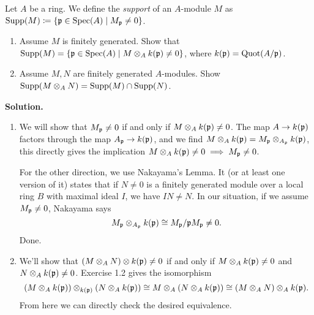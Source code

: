 \documentclass[a4paper,11pt]{article}
\begin{document}
Let $A$ be a ring. We define the \textit{support} of an $A$-module $M$
as $\operatorname{Supp}(M) \coloneqq \{ \mathfrak{p} \in \operatorname{Spec}(A) \mid M_{\mathfrak{p}} \neq 0\}$.
\begin{enumerate}
    \item Assume $M$ is finitely generated. Show that $\operatorname{Supp}(M) 
        = \{\mathfrak{p} \in \operatorname{Spec}(A) \mid M \otimes_A k(\mathfrak{p}) \neq 0\}$, where
        $k(\mathfrak{p}) = \mathrm{Quot}(A/\mathfrak{p})$. 
    \item Assume $M,N$ are finitely generated $A$-modules. Show 
        $\operatorname{Supp}(M\otimes_A N) = \operatorname{Supp}(M) \cap \operatorname{Supp}(N)$.
\end{enumerate}
\textbf{Solution.} 
\begin{enumerate}
    \item We will show that $M_{\mathfrak{p}} \neq 0$ if and only if $M \otimes_A k(\mathfrak{p})
        \neq 0$. The map $A \to k(\mathfrak{p})$ factors through the map 
        $A_{\mathfrak{p}} \to k(\mathfrak{p})$, and we find $M \otimes_A k(\mathfrak{p}) = M_{\mathfrak{p}}
        \otimes_{A_{\mathfrak{p}}} k(\mathfrak{p})$, this directly gives the 
        implication $M \otimes_A k(\mathfrak{p}) \neq 0 \implies M_{\mathfrak{p}} \neq 0$. 

        For the other direction, we use Nakayama's Lemma. It (or at least one version
        of it) states that if $N \neq 0$ is a finitely generated module over a local ring
        $B$ with maximal ideal $I$, we have $IN \neq N$. In our situation, if
        we assume $M_{\mathfrak{p}} \neq 0$, Nakayama says
        \begin{equation*}
            M_{\mathfrak{p}} \otimes_{A_{\mathfrak{p}}} k(\mathfrak{p}) \cong M_{\mathfrak{p}}/\mathfrak{p} M_{\mathfrak{p}} \neq 0.
        \end{equation*}
        Done.
    \item We'll show that $(M \otimes_A N) \otimes k(\mathfrak{p}) \neq 0$ if and only if
        $M \otimes_A k(\mathfrak{p}) \neq 0$ and $N \otimes_A k(\mathfrak{p}) \neq 0$. 
        Exercise 1.2 gives the isomorphism
        \begin{equation*}
            (M \otimes_A k(\mathfrak{p})) \otimes_{k(\mathfrak{p})} (N \otimes_A k(\mathfrak{p}))
            \cong M \otimes_A (N \otimes_{A} k(\mathfrak{p})) \cong (M \otimes_A N) \otimes_A k(\mathfrak{p}).
        \end{equation*}
        From here we can directly check the desired equivalence.
\end{enumerate}
\end{document}
